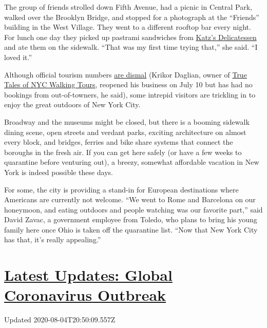 The group of friends strolled down Fifth Avenue, had a picnic in Central
Park, walked over the Brooklyn Bridge, and stopped for a photograph at
the ``Friends'' building in the West Village. They went to a different
rooftop bar every night. For lunch one day they picked up pastrami
sandwiches from \href{https://katzsdelicatessen.com/}{Katz's
Delicatessen} and ate them on the sidewalk. ``That was my first time
trying that,'' she said. ``I loved it.''

Although official tourism numbers
\href{https://www.nytimes3xbfgragh.onion/2020/07/24/nyregion/nyc-tourism-coronavirus.html}{are
dismal} (Krikor Daglian, owner of
\href{http://www.truetalesnyc.com/}{True Tales of NYC Walking Tours},
reopened his business on July 10 but has had no bookings from
out-of-towners, he said), some intrepid visitors are trickling in to
enjoy the great outdoors of New York City.

Broadway and the museums might be closed, but there is a booming
sidewalk dining scene, open streets and verdant parks, exciting
architecture on almost every block, and bridges, ferries and bike share
systems that connect the boroughs in the fresh air. If you can get here
safely (or have a few weeks to quarantine before venturing out), a
breezy, somewhat affordable vacation in New York is indeed possible
these days.

For some, the city is providing a stand-in for European destinations
where Americans are currently not welcome. ``We went to Rome and
Barcelona on our honeymoon, and eating outdoors and people watching was
our favorite part,'' said David Zavac, a government employee from
Toledo, who plans to bring his young family here once Ohio is taken off
the quarantine list. ``Now that New York City has that, it's really
appealing.''

\hypertarget{latest-updates-global-coronavirus-outbreak}{%
\section{\texorpdfstring{\href{https://www.nytimes3xbfgragh.onion/2020/08/04/world/coronavirus-cases.html?action=click\&pgtype=Article\&state=default\&region=MAIN_CONTENT_1\&context=storylines_live_updates}{Latest
Updates: Global Coronavirus
Outbreak}}{Latest Updates: Global Coronavirus Outbreak}}\label{latest-updates-global-coronavirus-outbreak}}

Updated 2020-08-04T20:50:09.557Z

